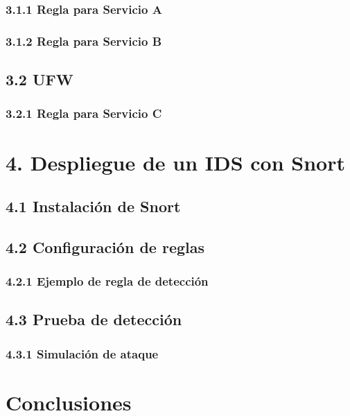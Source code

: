 \documentclass[12pt,a4paper]{article}
\begin{document}
\subsubsection{3.1.1 Regla para Servicio A}

\subsubsection{3.1.2 Regla para Servicio B}

\subsection{3.2 UFW}
\subsubsection{3.2.1 Regla para Servicio C}

\section{4. Despliegue de un IDS con Snort}
\subsection{4.1 Instalación de Snort}

\subsection{4.2 Configuración de reglas}
\subsubsection{4.2.1 Ejemplo de regla de detección}

\subsection{4.3 Prueba de detección}
\subsubsection{4.3.1 Simulación de ataque}

\section{Conclusiones}
\end{document}
